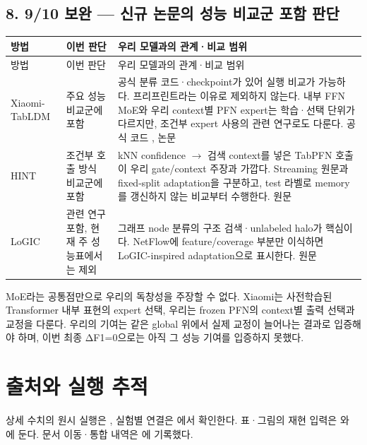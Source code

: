\subsection*{8. 9/\allowbreak{}10 보완 — 신규 논문의 성능 비교군 포함 판단}
\begingroup
\footnotesize
\begin{longtable}{>{\raggedright\arraybackslash}p{}>{\raggedright\arraybackslash}p{}>{\raggedright\arraybackslash}p{}}
\toprule
방법 & 이번 판단 & 우리 모델과의 관계·비교 범위 \\ \midrule
\endfirsthead
방법 & 이번 판단 & 우리 모델과의 관계·비교 범위 \\ \midrule
\endhead
{}Xiaomi-TabLDM & 주요 성능 비교군에 포함 & 공식 분류 코드·checkpoint가 있어 실행 비교가 가능하다. 프리프린트라는 이유로 제외하지 않는다. 내부 FFN MoE와 우리 context별 PFN expert는 학습·선택 단위가 다르지만, 조건부 expert 사용의 관련 연구로도 다룬다. 공식 코드 , 논문 \\
{}HINT & 조건부 호출 방식 비교군에 포함 & kNN confidence  \ensuremath{\rightarrow}  검색 context를 넣은 TabPFN 호출이 우리 gate/\allowbreak{}context 주장과 가깝다. Streaming 원문과 fixed-split adaptation을 구분하고, test 라벨로 memory를 갱신하지 않는 비교부터 수행한다. 원문 \\
{}LoGIC & 관련 연구 포함, 현재 주 성능표에서는 제외 & 그래프 node 분류의 구조 검색·unlabeled halo가 핵심이다. NetFlow에 feature/\allowbreak{}coverage 부분만 이식하면 LoGIC-inspired adaptation으로 표시한다. 원문 \\
\bottomrule
\end{longtable}
\endgroup
MoE라는 공통점만으로 우리의 독창성을 주장할 수 없다. Xiaomi는 사전학습된 Transformer 내부 표현의 expert 선택, 우리는 frozen PFN의 context별 출력 선택과 교정을 다룬다. 우리의 기여는 같은 global 위에서 실제 교정이 늘어나는 결과로 입증해야 하며, 이번 최종 ΔF1=\allowbreak{}0으로는 아직 그 성능 기여를 입증하지 못했다.



\section*{출처와 실행 추적}

상세 수치의 원시 실행은 , 실험별 연결은 에서 확인한다. 표·그림의 재현 입력은 와 에 둔다. 문서 이동·통합 내역은 에 기록했다.


